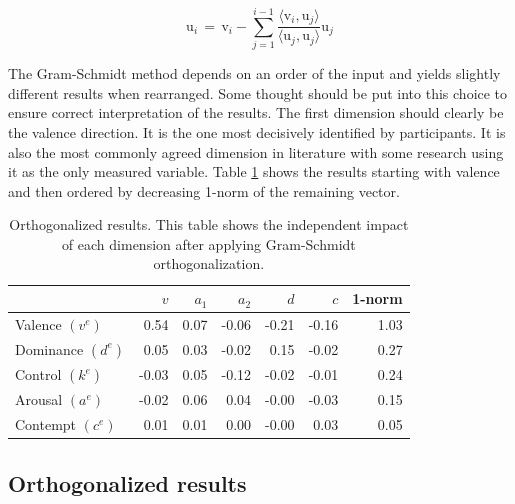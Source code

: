 \begin{equation}
  \mbox{u}_i
  \,=\,
  \mbox{v}_i - \sum\limits^{i-1}_{j=1}
    \frac{\langle
      \mbox{v}_i, \mbox{u}_j
    \rangle}
    {\langle
      \mbox{u}_j, \mbox{u}_j
    \rangle}
    \mbox{u}_j
  \label{eqn:gramschmidt}
\end{equation}

The Gram-Schmidt method depends on an order of the input and yields slightly different results when rearranged.
Some thought should be put into this choice to ensure correct interpretation of the results.
The first dimension should clearly be the valence direction. It is the one most decisively identified by participants. It is
also the most commonly agreed dimension in literature with some research using it as the only measured variable.
Table \ref{tab:ortho_data} shows the results starting with valence and then ordered by decreasing 1-norm of the remaining vector.

\begin{table}[ht!]
  \begin{center}
    \begin{tabular}{lrrrrrr}
      {} &         $v$ &     $a_1$ &     $a_2$ &     $d$ &     $c$ &       1-norm \\
      \midrule
      Valence $(v^e)$   &  0.54 & 0.07 & -0.06 & -0.21 & -0.16 & 1.03 \\
      Dominance $(d^e)$ &  0.05 & 0.03 & -0.02 &  0.15 & -0.02 & 0.27 \\
      Control $(k^e)$   & -0.03 & 0.05 & -0.12 & -0.02 & -0.01 & 0.24 \\
      Arousal $(a^e)$   & -0.02 & 0.06 &  0.04 & -0.00 & -0.03 & 0.15 \\
      Contempt $(c^e)$  &  0.01 & 0.01 &  0.00 & -0.00 &  0.03 & 0.05 \\
      \midrule
    \end{tabular}
  \end{center}
  \caption{Orthogonalized results. This table shows the independent impact of each dimension after
  applying Gram-Schmidt orthogonalization.}
  \label{tab:ortho_data}
\end{table}

\subsection{Orthogonalized results}

